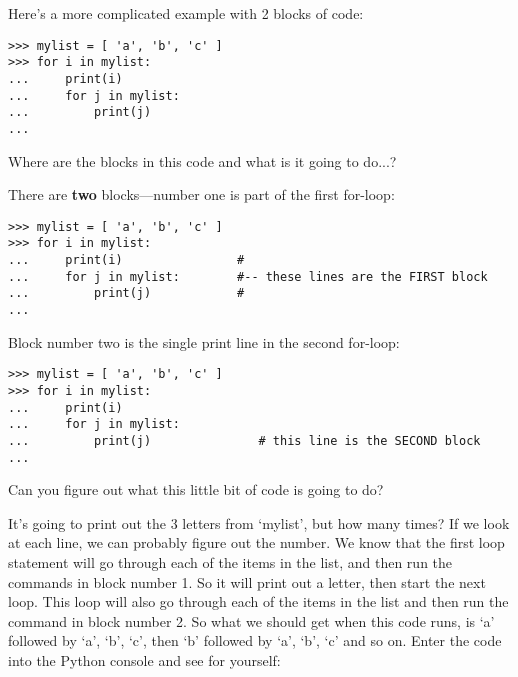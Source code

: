 
\par
Here's a more complicated example with 2 blocks of code:

\begin{listing}
\begin{verbatim}
>>> mylist = [ 'a', 'b', 'c' ]
>>> for i in mylist:
...     print(i)
...     for j in mylist:
...         print(j)
...
\end{verbatim}
\end{listing}

\noindent
Where are the blocks in this code and what is it going to do...?
\par
\noindent
There are \textbf{two} blocks---number one is part of the first for-loop:

\begin{listing}
\begin{verbatim}
>>> mylist = [ 'a', 'b', 'c' ]
>>> for i in mylist:
...     print(i)                #
...     for j in mylist:        #-- these lines are the FIRST block
...         print(j)            #
...
\end{verbatim}
\end{listing}

Block number two is the single print line in the second for-loop:

\begin{listing}
\begin{verbatim}
>>> mylist = [ 'a', 'b', 'c' ]
>>> for i in mylist:
...     print(i)
...     for j in mylist:
...         print(j)               # this line is the SECOND block
...
\end{verbatim}
\end{listing}

Can you figure out what this little bit of code is going to do?
\par
It's going to print out the 3 letters from `mylist', but how many times?  If we look at each line, we can probably figure out the number. We know that the first loop statement will go through each of the items in the list, and then run the commands in block number 1. So it will print out a letter, then start the next loop. This loop will also go through each of the items in the list and then run the command in block number 2.  So what we should get when this code runs, is `a' followed by `a', `b', `c', then `b' followed by `a', `b', `c' and so on. Enter the code into the Python console and see for yourself:

